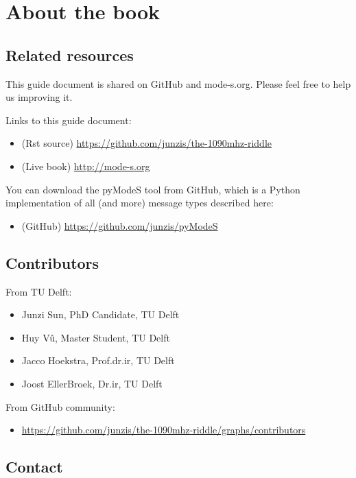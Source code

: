 \chapter{About the book}

\section{Related resources}\label{related-resources}

This guide document is shared on GitHub and mode-s.org. Please feel free
to help us improving it.

Links to this guide document:

\begin{itemize}
\item
  (Rst source) \url{https://github.com/junzis/the-1090mhz-riddle}
\item
  (Live book) \url{http://mode-s.org}
\end{itemize}

You can download the pyModeS tool from GitHub, which is a Python
implementation of all (and more) message types described here:

\begin{itemize}
\item
  (GitHub) \url{https://github.com/junzis/pyModeS}
\end{itemize}

\section{Contributors}\label{contributors}

From TU Delft:

\begin{itemize}
\item
  Junzi Sun, PhD Candidate, TU Delft
\item
  Huy V\^u, Master Student, TU Delft
\item
  Jacco Hoekstra, Prof.dr.ir, TU Delft
\item
  Joost EllerBroek, Dr.ir, TU Delft
\end{itemize}

From GitHub community:

\begin{itemize}
\item
  \url{https://github.com/junzis/the-1090mhz-riddle/graphs/contributors}
\end{itemize}

\section{Contact}\label{contact}

